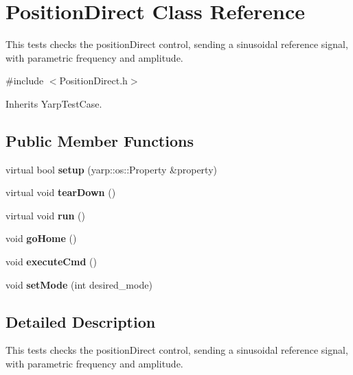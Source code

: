 \section{Position\-Direct Class Reference}
\label{classPositionDirect}


This tests checks the position\-Direct control, sending a sinusoidal reference signal, with parametric frequency and amplitude.  




{\ttfamily \#include $<$Position\-Direct.\-h$>$}



Inherits Yarp\-Test\-Case.

\subsection*{Public Member Functions}
\begin{DoxyCompactItemize}
\item 
virtual bool {\bfseries setup} (yarp\-::os\-::\-Property \&property)\label{classPositionDirect_a65b1833e16c9185db0d488248e59d7cc}

\item 
virtual void {\bfseries tear\-Down} ()\label{classPositionDirect_a84243f0cd8e5269d486899febfc47cca}

\item 
virtual void {\bfseries run} ()\label{classPositionDirect_a70210708c01218e1aabbc657a16d85f4}

\item 
void {\bfseries go\-Home} ()\label{classPositionDirect_a2dd8350755621895f0bb36d176d65e4e}

\item 
void {\bfseries execute\-Cmd} ()\label{classPositionDirect_aa6f6d0aafdb7e339fa07bbc5232b4dfb}

\item 
void {\bfseries set\-Mode} (int desired\-\_\-mode)\label{classPositionDirect_aa18a4e2b7558adf62e72873a78fed7bd}

\end{DoxyCompactItemize}


\subsection{Detailed Description}
This tests checks the position\-Direct control, sending a sinusoidal reference signal, with parametric frequency and amplitude. 


